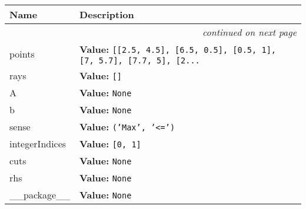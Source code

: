     \vspace{-1cm}
\hspace{\varindent}\begin{longtable}{|p{\varnamewidth}|p{\vardescrwidth}|l}
\cline{1-2}
\cline{1-2} \centering \textbf{Name} & \centering \textbf{Description}& \\
\cline{1-2}
\endhead\cline{1-2}\multicolumn{3}{r}{\small\textit{continued on next page}}\\\endfoot\cline{1-2}
\endlastfoot\raggedright p\-o\-i\-n\-t\-s\- & \raggedright \textbf{Value:} 
{\tt \texttt{[}\texttt{[}2.5\texttt{, }4.5\texttt{]}\texttt{, }\texttt{[}6.5\texttt{, }0.5\texttt{]}\texttt{, }\texttt{[}0.5\texttt{, }1\texttt{]}\texttt{, }\texttt{[}7\texttt{, }5.7\texttt{]}\texttt{, }\texttt{[}7.7\texttt{, }5\texttt{]}\texttt{, }\texttt{[}2\texttt{...}}&\\
\cline{1-2}
\raggedright r\-a\-y\-s\- & \raggedright \textbf{Value:} 
{\tt \texttt{[}\texttt{]}}&\\
\cline{1-2}
\raggedright A\- & \raggedright \textbf{Value:} 
{\tt None}&\\
\cline{1-2}
\raggedright b\- & \raggedright \textbf{Value:} 
{\tt None}&\\
\cline{1-2}
\raggedright s\-e\-n\-s\-e\- & \raggedright \textbf{Value:} 
{\tt \texttt{(}\texttt{'}\texttt{Max}\texttt{'}\texttt{, }\texttt{'}\texttt{{\textless}=}\texttt{'}\texttt{)}}&\\
\cline{1-2}
\raggedright i\-n\-t\-e\-g\-e\-r\-I\-n\-d\-i\-c\-e\-s\- & \raggedright \textbf{Value:} 
{\tt \texttt{[}0\texttt{, }1\texttt{]}}&\\
\cline{1-2}
\raggedright c\-u\-t\-s\- & \raggedright \textbf{Value:} 
{\tt None}&\\
\cline{1-2}
\raggedright r\-h\-s\- & \raggedright \textbf{Value:} 
{\tt None}&\\
\cline{1-2}
\raggedright \_\-\_\-p\-a\-c\-k\-a\-g\-e\-\_\-\_\- & \raggedright \textbf{Value:} 
{\tt None}&\\
\cline{1-2}
\end{longtable}

